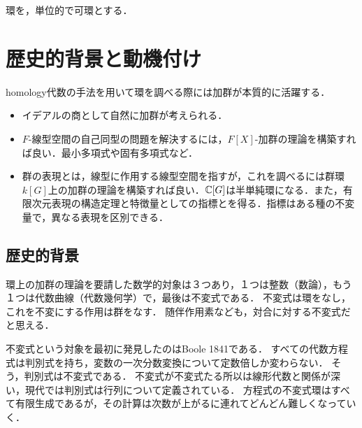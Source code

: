 \documentclass[uplatex,dvipdfmx]{jsreport}
\begin{document}
\begin{notation*}
    環を，単位的で可環とする．
\end{notation*}

\section{歴史的背景と動機付け}

\begin{tcolorbox}[colframe=ForestGreen, colback=ForestGreen!10!white,breakable,colbacktitle=ForestGreen!40!white,coltitle=black,fonttitle=\bfseries\sffamily,
    title=]
    homology代数の手法を用いて環を調べる際には加群が本質的に活躍する．
    \begin{itemize}
        \item イデアルの商として自然に加群が考えられる．
        \item $F$-線型空間の自己同型の問題を解決するには，$F[X]$-加群の理論を構築すれば良い．最小多項式や固有多項式など．
        \item 群の表現とは，線型に作用する線型空間を指すが，これを調べるには群環$k[G]$上の加群の理論を構築すれば良い．$\mathbb{C}[G]$は半単純環になる．また，有限次元表現の構造定理と特徴量としての指標とを得る．指標はある種の不変量で，異なる表現を区別できる．
    \end{itemize}
\end{tcolorbox}


\subsection{歴史的背景}

\begin{tcolorbox}[colframe=ForestGreen, colback=ForestGreen!10!white,breakable,colbacktitle=ForestGreen!40!white,coltitle=black,fonttitle=\bfseries\sffamily,
title=]
    環上の加群の理論を要請した数学的対象は３つあり，１つは整数（数論），もう１つは代数曲線（代数幾何学）で，最後は不変式である．
    不変式は環をなし，これを不変にする作用は群をなす．
    随伴作用素なども，対合に対する不変式だと思える．
\end{tcolorbox}

\begin{history}
    不変式という対象を最初に発見したのはBoole 1841である．
    すべての代数方程式は判別式を持ち，変数の一次分数変換について定数倍しか変わらない．
    そう，判別式は不変式である．
    不変式が不変式たる所以は線形代数と関係が深い，現代では判別式は行列について定義されている．
    方程式の不変式環はすべて有限生成であるが，その計算は次数が上がるに連れてどんどん難しくなっていく．
\end{history}
\end{document}
